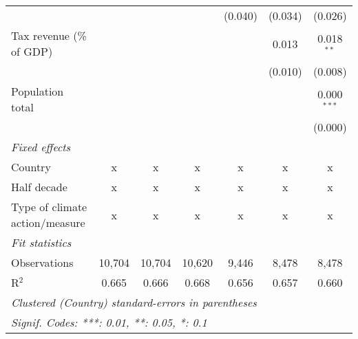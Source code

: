 \begin{tabular}{lcccccc}
                                                &         &                &                & (0.040)        & (0.034)        & (0.026)\\   
   Tax revenue (\% of GDP)                      &         &                &                &                & 0.013          & 0.018$^{**}$\\   
                                                &         &                &                &                & (0.010)        & (0.008)\\   
   Population total                             &         &                &                &                &                & 0.000$^{***}$\\   
                                                &         &                &                &                &                & (0.000)\\   
   \emph{Fixed effects}\\
   Country                                      & x       & x              & x              & x              & x              & x\\  
   Half decade                                  & x       & x              & x              & x              & x              & x\\  
   Type of climate action/measure               & x       & x              & x              & x              & x              & x\\  
   \midrule \emph{Fit statistics}\\
   Observations                                 & 10,704  & 10,704         & 10,620         & 9,446          & 8,478          & 8,478\\  
   R$^2$                                        & 0.665   & 0.666          & 0.668          & 0.656          & 0.657          & 0.660\\  
   \midrule
   \multicolumn{7}{l}{\emph{Clustered (Country) standard-errors in parentheses}}\\
   \multicolumn{7}{l}{\emph{Signif. Codes: ***: 0.01, **: 0.05, *: 0.1}}\\
\end{tabular}
\par\endgroup


